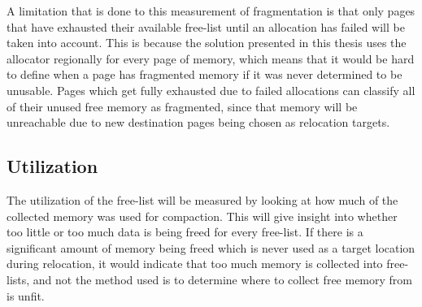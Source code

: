 A limitation that is done to this measurement of fragmentation is that only pages that have exhausted their available free-list until an allocation has failed will be taken into account. This is because the solution presented in this thesis uses the allocator regionally for every page of memory, which means that it would be hard to define when a page has fragmented memory if it was never determined to be unusable. Pages which get fully exhausted due to failed allocations can classify all of their unused free memory as fragmented, since that memory will be unreachable due to new destination pages being chosen as relocation targets.

\subsection{Utilization}
The utilization of the free-list will be measured by looking at how much of the collected memory was used for compaction. This will give insight into whether too little or too much data is being freed for every free-list. If there is a significant amount of memory being freed which is never used as a target location during relocation, it would indicate that too much memory is collected into free-lists, and not the method used is to determine where to collect free memory from is unfit.


